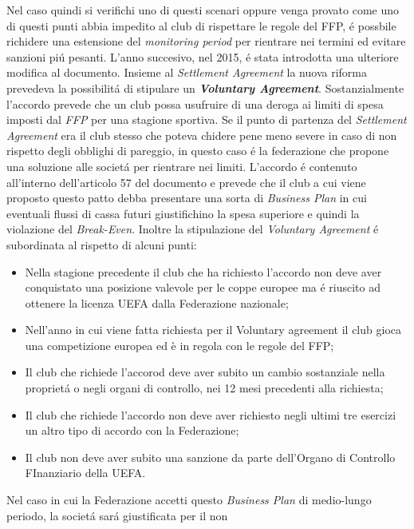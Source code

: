 \documentclass[
    corpo=12pt,
    oneside,
    evenboxes,
    tipotesi=triennale,
    stile=classica,
    oldstyle,
    autoretitolo,
    greek,
]{toptesi}
\begin{document}
\begin{interlinea}{1.5}
\begin{enumerate}
\end{enumerate}
Nel caso quindi si verifichi uno di questi scenari oppure venga provato come uno di questi punti abbia impedito al club di rispettare le 
regole del FFP, \'e possbile richidere una estensione del \emph{monitoring period} per rientrare nei termini ed evitare 
sanzioni pi\'u pesanti.\newline
L'anno succesivo, nel 2015, \'e stata introdotta una ulteriore modifica al documento. Insieme al \emph{Settlement Agreement} la nuova riforma
prevedeva la possibilit\'a di \linebreak stipulare un \emph{\textbf{Voluntary Agreement}}. Sostanzialmente l'accordo prevede che un club possa usufruire di una
deroga ai limiti di spesa imposti dal \emph{FFP} per una stagione sportiva. Se il punto di partenza del \emph{Settlement Agreement} era il
club stesso che poteva chidere pene meno severe in caso di non rispetto degli obblighi di pareggio, in questo caso \'e la federazione che
propone una soluzione alle societ\'a per rientrare nei limiti. L'accordo \'e contenuto all'interno dell'articolo 57 del documento e prevede 
che il club a cui viene proposto questo patto debba presentare una sorta di \emph{Business Plan} in cui eventuali flussi di cassa futuri 
giustifichino la spesa superiore e quindi la violazione del \emph{Break-Even}. Inoltre la stipulazione del \emph{Voluntary Agreement} \'e
subordinata al rispetto di alcuni punti:
\begin{itemize}
    \item Nella stagione precedente il club che ha richiesto l'accordo non deve aver conquistato una posizione valevole per le coppe
    europee ma \'e riuscito ad ottenere la licenza UEFA dalla Federazione nazionale;
    \item Nell’anno in cui viene fatta richiesta per il Voluntary agreement il club gioca una competizione europea ed è in regola con
    le regole del FFP;
    \item Il club che richiede l'accorod deve aver subito un cambio sostanziale nella propriet\'a o negli organi di controllo, nei 12 mesi 
    precedenti alla richiesta;
    \item Il club che richiede l'accordo non deve aver richiesto negli ultimi tre esercizi un altro tipo di accordo con la Federazione;
    \item Il club non deve aver subito una sanzione da parte dell'Organo di Controllo FInanziario della UEFA.
\end{itemize}
Nel caso in cui la Federazione accetti questo \emph{Business Plan} di medio-lungo periodo, la societ\'a sar\'a giustificata per il non 

\end{interlinea}
\end{document}
